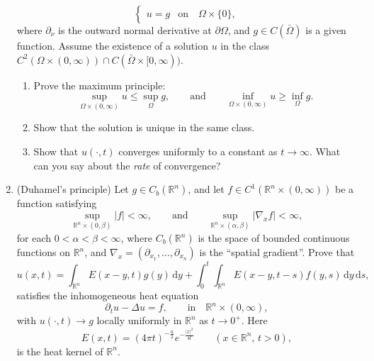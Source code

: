 \documentclass[11pt]{amsart}
\newcommand{\R}{\mathbb{R}}
\newcommand{\exd}{\mathrm{d}}
\begin{document}
\begin{enumerate}[1.]
$$\begin{cases}
u = g &\textrm{on} \quad \Omega\times\{0\},
\end{cases}
$$
where $\partial_\nu$ is the outward normal derivative at $\partial\Omega$,
and $g\in C(\bar\Omega)$ is a given function.
Assume the existence of a solution $u$ in the class $C^2(\Omega\times(0,\infty)) \cap C(\bar{\Omega}\times[0,\infty))$.
\begin{enumerate}
\item[a)]
Prove the maximum principle: 
$$
\sup_{\Omega\times(0,\infty)} u \leq \sup_\Omega g,
\qquad\textrm{and}\qquad
\inf_{\Omega\times(0,\infty)} u \geq \inf_\Omega g.
$$
\item[b)]
Show that the solution is unique in the same class.
\item[c)]
Show that $u(\cdot,t)$ converges uniformly to a constant as $t\to\infty$.
What can you say about the {\em rate} of convergence?
\end{enumerate}
\item (Duhamel's principle)
Let $g\in C_b(\R^n)$, and let $f\in C^1(\R^n\times(0,\infty))$ be a function satisfying
$$
\sup_{\R^n\times(0,\beta)} |f| < \infty,
\qquad\textrm{and}\qquad
\sup_{\R^n\times(\alpha,\beta)} |\nabla_x f| < \infty,
$$
for each $0<\alpha<\beta<\infty$, 
where $C_b(\R^n)$ is the space of bounded continuous functions on $\R^n$,
and $\nabla_x=(\partial_{x_1},\ldots,\partial_{x_n})$ is the ``spatial gradient''.
Prove that
$$
u(x,t) = \int_{\R^n} E(x-y,t) g(y) \, \exd y +  \int_0^t \int_{\R^n} E(x-y,t-s) f(y,s) \, \exd y \, \exd s ,
$$
satisfies the inhomogeneous heat equation
$$
\partial_t u - \Delta u = f ,
\qquad\textrm{in}\quad \R^n\times(0,\infty) ,
$$
with $u(\cdot,t)\to g$ locally uniformly in $\R^n$ as $t\to0^+$.
Here 
$$
E(x,t) = (4\pi t)^{-\frac{n}2} e^{-\frac{|x|^2}{4t}}
\qquad (x\in\R^n,\,t>0) ,
$$
is the heat kernel of $\R^n$.
\end{enumerate}
\end{document}
